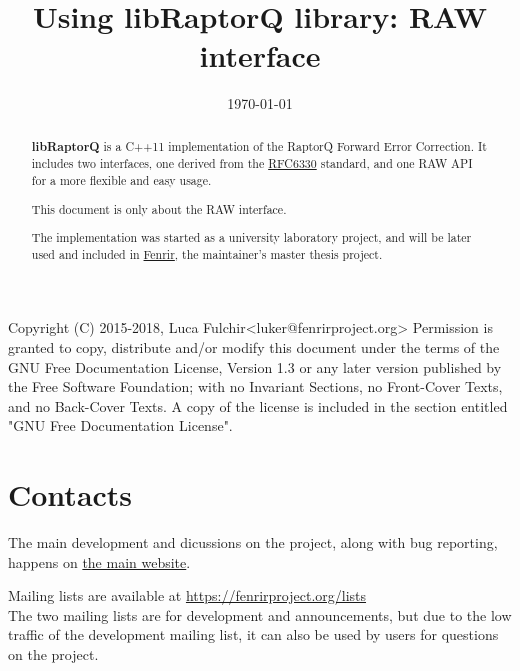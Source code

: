\documentclass[11pt,a4paper]{refart}
\title{Using libRaptorQ library: RAW interface}
\date{\today}
\begin{document}
\maketitle

\begin{abstract}

\textbf{libRaptorQ} is a C++11
 implementation of the RaptorQ Forward Error Correction. It includes two interfaces, one derived from the \href{https://tools.ietf.org/html/rfc6330}{RFC6330} standard, and one RAW API for a more flexible and easy usage.

This document is only about the RAW interface.

The implementation was started as a university laboratory project, and will be later used and included in \href{https://www.fenrirproject.org}{Fenrir}, the
maintainer's master thesis project.



\end{abstract}

\vfill\hfill
\begin{verbbox}[\tiny]
Copyright (C)  2015-2018, Luca Fulchir<luker@fenrirproject.org>
Permission is granted to copy, distribute and/or modify this document
under the terms of the GNU Free Documentation License, Version 1.3
or any later version published by the Free Software Foundation;
with no Invariant Sections, no Front-Cover Texts, and no Back-Cover Texts.
A copy of the license is included in the section entitled "GNU
Free Documentation License".
\end{verbbox}
\theverbbox

\newpage
\tableofcontents
\newpage


\section{Contacts}

The main development and dicussions on the project, along with bug reporting, happens on
\href{https://fenrirproject.org/Luker/libRaptorQ}{the main website}.

 Mailing lists are available at \href{https://fenrirproject.org/lists}{https://fenrirproject.org/lists}\\
The two mailing lists are for development and announcements, but due to the low traffic of the development mailing list, it
can also be used by users for questions on the project.
\end{document}
